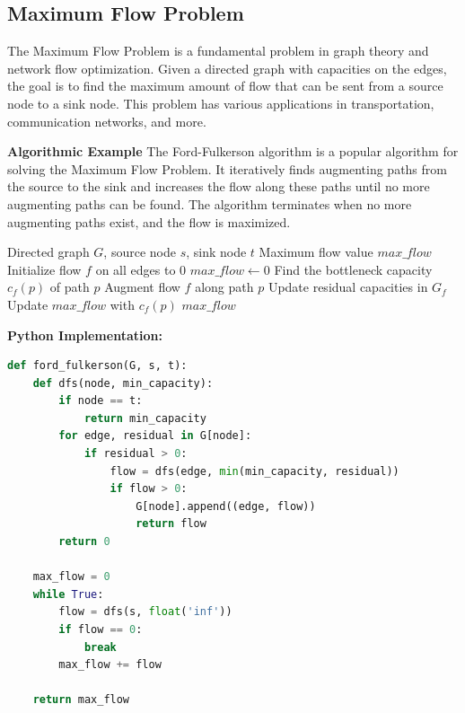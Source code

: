 \documentclass[12pt]{book} %
\begin{document}
\subsection{Maximum Flow Problem}
The Maximum Flow Problem is a fundamental problem in graph theory and network flow optimization. Given a directed graph with capacities on the edges, the goal is to find the maximum amount of flow that can be sent from a source node to a sink node. This problem has various applications in transportation, communication networks, and more.

\textbf{Algorithmic Example}
\FloatBarrier
The Ford-Fulkerson algorithm is a popular algorithm for solving the Maximum Flow Problem. It iteratively finds augmenting paths from the source to the sink and increases the flow along these paths until no more augmenting paths can be found. The algorithm terminates when no more augmenting paths exist, and the flow is maximized.
\FloatBarrier
\begin{algorithm}
\caption{Ford-Fulkerson Algorithm}
\begin{algorithmic}
\Require Directed graph $G$, source node $s$, sink node $t$
\Ensure Maximum flow value $max\_flow$
    \State Initialize flow $f$ on all edges to 0
    \State $max\_flow \gets 0$
        \State Find the bottleneck capacity $c_f(p)$ of path $p$
        \State Augment flow $f$ along path $p$
        \State Update residual capacities in $G_f$
        \State Update $max\_flow$ with $c_f(p)$
    \EndWhile
    \State \Return $max\_flow$
\EndFunction
\end{algorithmic}
\end{algorithm}
\FloatBarrier
\textbf{Python Implementation:}
\FloatBarrier
\begin{lstlisting}[language=Python, caption=Ford-Fulkerson Algorithm in Python]
def ford_fulkerson(G, s, t):
    def dfs(node, min_capacity):
        if node == t:
            return min_capacity
        for edge, residual in G[node]:
            if residual > 0:
                flow = dfs(edge, min(min_capacity, residual))
                if flow > 0:
                    G[node].append((edge, flow))
                    return flow
        return 0

    max_flow = 0
    while True:
        flow = dfs(s, float('inf'))
        if flow == 0:
            break
        max_flow += flow

    return max_flow
\end{lstlisting}
\end{document}
